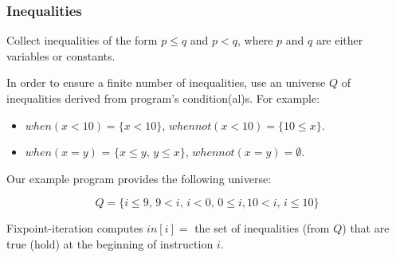 \documentclass{beamer}
\begin{document}
\begin{frame}
\frametitle{Inequalities}

Collect inequalities of the form $p \leq q$ and $p<q$, where $p$ and $q$ are
either variables or constants.\smallskip

In order to ensure a finite number of inequalities, use an universe $Q$ of
inequalities derived from program's condition(al)s. For example:\smallskip

\begin{itemize}

\item $when(x < 10) = \{x < 10\}$, $whennot(x<10)=\{10 \leq x\}$.\smallskip

\item $when(x = y)$ = $\{x \leq y,\, y \leq x\}$, $whennot(x=y)=\emptyset$.

\end{itemize}

\bigskip

Our example program provides the following universe:

\[Q = \{i\leq 9,\,9<i,\,i<0,\,0\leq i,10<i,\,i\leq 10\}\]

Fixpoint-iteration computes $in[i] = {}$ the set of inequalities (from $Q$) 
that are true (hold) at the beginning of instruction $i$.

\end{frame}
\end{document}
